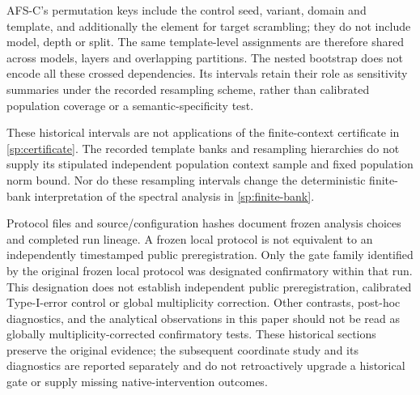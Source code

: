 AFS-C's permutation keys include the control seed, variant,
domain and template, and additionally the element for target
scrambling; they do not include model, depth or split.
The same template-level assignments are therefore shared
across models, layers and overlapping partitions.
The nested bootstrap does not encode all these crossed
dependencies.
Its intervals retain their role as sensitivity summaries
under the recorded resampling scheme, rather than calibrated
population coverage or a semantic-specificity test.

These historical intervals are not applications of the
finite-context certificate in \cref{sp:certificate}.
The recorded template banks and resampling hierarchies do
not supply its stipulated independent population context
sample and fixed population norm bound.
Nor do these resampling intervals change the deterministic
finite-bank interpretation of the spectral analysis
in \cref{sp:finite-bank}.

Protocol files and source/configuration hashes document frozen
analysis choices and completed run lineage.
A frozen local protocol is not equivalent to an independently
timestamped public preregistration.
Only the gate family identified by the original frozen local
protocol was designated confirmatory within that run.
This designation does not establish independent public
preregistration, calibrated Type-I-error control or global
multiplicity correction.
Other contrasts, post-hoc diagnostics, and the analytical
observations in this paper should not be read as globally
multiplicity-corrected confirmatory tests.
These historical sections preserve the original evidence;
the subsequent coordinate study and its diagnostics are
reported separately and do not retroactively upgrade a
historical gate or supply missing native-intervention outcomes.
